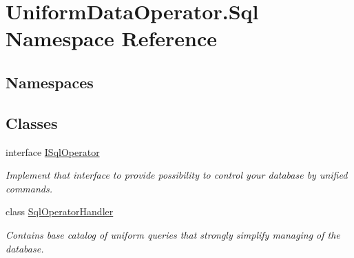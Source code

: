 \hypertarget{namespace_uniform_data_operator_1_1_sql}{}\section{Uniform\+Data\+Operator.\+Sql Namespace Reference}
\label{namespace_uniform_data_operator_1_1_sql}
\subsection*{Namespaces}
\begin{DoxyCompactItemize}
\end{DoxyCompactItemize}
\subsection*{Classes}
\begin{DoxyCompactItemize}
\item 
interface \mbox{\hyperlink{interface_uniform_data_operator_1_1_sql_1_1_i_sql_operator}{I\+Sql\+Operator}}
\begin{DoxyCompactList}\small\item\em Implement that interface to provide possibility to control your database by unified commands. \end{DoxyCompactList}\item 
class \mbox{\hyperlink{class_uniform_data_operator_1_1_sql_1_1_sql_operator_handler}{Sql\+Operator\+Handler}}
\begin{DoxyCompactList}\small\item\em Contains base catalog of uniform queries that strongly simplify managing of the database. \end{DoxyCompactList}\end{DoxyCompactItemize}
